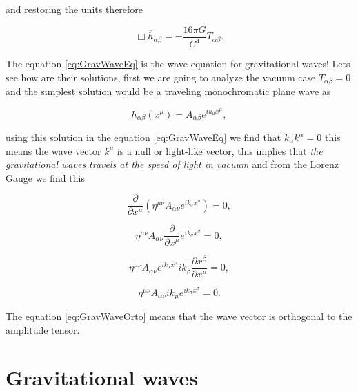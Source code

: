     and restoring the units therefore

    \begin{equation}\label{eq:GravWaveEq}
        \Box\overline{h}_{\alpha\beta}=-\frac{16\pi G}{C^4}T_{\alpha\beta}.
    \end{equation}

    The equation \ref{eq:GravWaveEq}  is the wave equation for gravitational waves! Lets see how are their solutions, first we are going to analyze the vacuum case $T_{\alpha\beta}=0$ and the simplest  solution would be a traveling monochromatic plane wave as

    \begin{equation}
        \overline{h}_{\alpha\beta}(x^{\mu}) = A_{\alpha\beta}e^{ik_{\mu}x^{\mu}},
    \end{equation}

    using this solution in the equation \ref{eq:GravWaveEq} we find that $k_{\alpha}k^{\alpha}=0$ this means the wave vector $k^{\mu}$ is a null or light-like vector, this implies that \textit{the gravitational waves travels at the speed of light in vacuum} and from the  Lorenz Gauge we find this

    \begin{equation}
        \frac{\partial}{\partial x^{\mu}}\left(\eta^{\mu\nu}A_{\alpha\nu}e^{ik_{\sigma}x^{\sigma}} \right)=0,
    \end{equation}

    \begin{equation}
        \eta^{\mu\nu}A_{\alpha\nu}\frac{\partial}{\partial x^{\mu}}e^{ik_{\sigma}x^{\sigma}}=0,
    \end{equation}

    \begin{equation}
        \eta^{\mu\nu}A_{\alpha\nu}e^{ik_{\sigma}x^{\sigma}}ik_{\beta}\frac{\partial x^{\beta}}{\partial x^{\mu}} = 0,
    \end{equation}

    \begin{equation}\label{eq:GravWaveOrto}
        \eta^{\mu\nu}A_{\alpha\nu}ik_{\mu}e^{ik_{\sigma}x^{\sigma}}=0.
    \end{equation}

    The equation \ref{eq:GravWaveOrto} means that the wave vector is orthogonal to the amplitude tensor.
\section{Gravitational waves}

